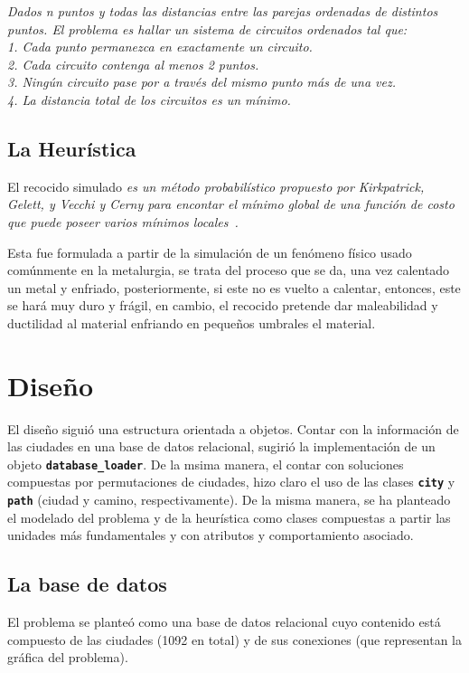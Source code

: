 \documentclass[a4paper]{report}
\begin{document}
\begin{center}
  \textit{Dados n puntos y todas las distancias entre las parejas ordenadas de
    distintos puntos. El problema es hallar un sistema de circuitos ordenados tal que:\\
    1. Cada punto permanezca en exactamente un circuito.\\
    2. Cada circuito contenga al menos 2 puntos.\\
    3. Ning\'un circuito pase por a trav\'es del mismo punto m\'as de una vez.\\
    4. La distancia total de los circuitos es un m\'inimo.
  }~\cite{julia}
\end{center}


\section{La Heur\'istica}
El recocido simulado \textit{es un m\'etodo probabil\'istico propuesto por Kirkpatrick, Gelett,
  y Vecchi y Cerny para encontar el m\'inimo global de una funci\'on de costo que puede poseer
  varios m\'inimos locales~\cite{dimitris}.}

Esta fue formulada a partir de la simulaci\'on de un fen\'omeno f\'isico usado com\'unmente
en la metalurgia, se trata del proceso que se da, una vez calentado un metal y enfriado, posteriormente,
si este no es vuelto a calentar, entonces, este se har\'a muy duro y fr\'agil, en cambio, el recocido
pretende dar maleabilidad y ductilidad al material enfriando en peque\~nos umbrales el material.

\chapter{Dise\~no}

El dise\~no sigui\'o una estructura orientada a objetos. Contar con la informaci\'on
de las ciudades en una base de datos relacional, sugiri\'o la implementaci\'on de
un objeto \textbf{\texttt{database\_loader}}. De la msima manera, el contar con soluciones
compuestas por permutaciones de ciudades, hizo claro el uso de las clases
\textbf{\texttt{city}} y \textbf{\texttt{path}} (ciudad y camino, respectivamente).
De la misma manera, se ha planteado el modelado del problema y de la heur\'istica
como clases compuestas a partir las unidades m\'as fundamentales y con atributos y
comportamiento asociado.\\

\section{La base de datos}
El problema se plante\'o como una base de datos relacional cuyo contenido est\'a
compuesto de las ciudades (1092 en total) y de sus conexiones (que representan
la gr\'afica del problema).\\
\end{document}
